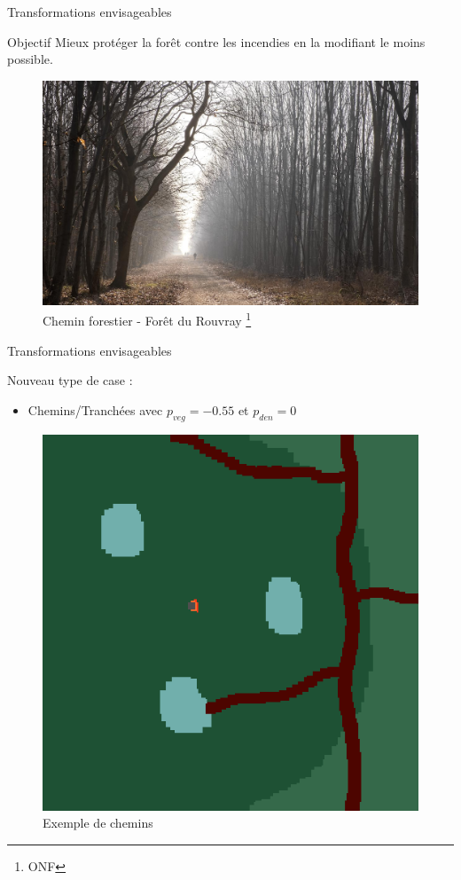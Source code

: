 \documentclass{beamer}
\begin{document}
\begin{frame}{Transformations envisageables \hyperlink{jump}{\beamerbutton{ }} \hypertarget{12}{\beamerbutton{ }}}
    \begin{block}{Objectif}
        Mieux protéger la forêt contre les incendies en la modifiant le moins possible.
    \end{block}

    \begin{figure}
        \centering
        \includegraphics[width=0.75\linewidth]{pictures/chemin.jpeg}
        \caption{Chemin forestier - Forêt du Rouvray \footnote{ONF}}
        \label{fig:enter-label}
    \end{figure}
\end{frame}

\begin{frame}{Transformations envisageables \hyperlink{jump}{\beamerbutton{ }} \hypertarget{13}{\beamerbutton{ }}}
    \begin{block}{Nouveau type de case :}
        \begin{itemize}
            \item Chemins/Tranchées avec $p_{veg} = -0.55$ et $p_{den} = 0$
        \end{itemize}
    \end{block}

    \begin{figure}
        \centering
        \includegraphics[width=.3\linewidth]{pictures/trans/treach_ex.png}
        \caption{Exemple de chemins}\label{Fig:Data1}
        \label{fig:enter-label}
    \end{figure}
\end{frame}
\end{document}
